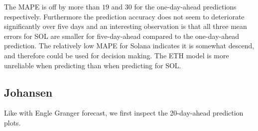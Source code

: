 \noindent  
The MAPE is off by more than $19$ and $30$ for the one-day-ahead predictions respectively. Furthermore the prediction accuracy does not seem to deteriorate significantly over five days and an interesting observation is that all three mean errors for SOL are smaller for five-day-ahead compared to the one-day-ahead prediction. The relatively low MAPE for Solana indicates it is somewhat descend, and therefore could be used for decision making. The ETH model is more unreliable when predicting than when predicting for SOL.
\pause

\subsection{Johansen}
Like with Engle Granger forecast, we first inspect the 20-day-ahead prediction plots. 

